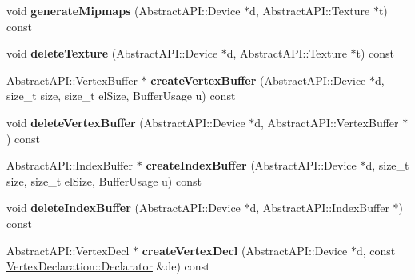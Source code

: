 \begin{DoxyCompactItemize}
\item 
\hypertarget{class_tempest_1_1_direct_x9_aa71036e276637c1db1acb5f01595300e}{void {\bfseries generate\+Mipmaps} (Abstract\+A\+P\+I\+::\+Device $\ast$d, Abstract\+A\+P\+I\+::\+Texture $\ast$t) const }\label{class_tempest_1_1_direct_x9_aa71036e276637c1db1acb5f01595300e}

\item 
\hypertarget{class_tempest_1_1_direct_x9_a702be05b45834a30d673f88cded2da1f}{void {\bfseries delete\+Texture} (Abstract\+A\+P\+I\+::\+Device $\ast$d, Abstract\+A\+P\+I\+::\+Texture $\ast$t) const }\label{class_tempest_1_1_direct_x9_a702be05b45834a30d673f88cded2da1f}

\item 
\hypertarget{class_tempest_1_1_direct_x9_af8da297fcff932c9ecaa7a0163abc74d}{Abstract\+A\+P\+I\+::\+Vertex\+Buffer $\ast$ {\bfseries create\+Vertex\+Buffer} (Abstract\+A\+P\+I\+::\+Device $\ast$d, size\+\_\+t size, size\+\_\+t el\+Size, Buffer\+Usage u) const }\label{class_tempest_1_1_direct_x9_af8da297fcff932c9ecaa7a0163abc74d}

\item 
\hypertarget{class_tempest_1_1_direct_x9_a13ea63b17205313562967bea5c41c41b}{void {\bfseries delete\+Vertex\+Buffer} (Abstract\+A\+P\+I\+::\+Device $\ast$d, Abstract\+A\+P\+I\+::\+Vertex\+Buffer $\ast$) const }\label{class_tempest_1_1_direct_x9_a13ea63b17205313562967bea5c41c41b}

\item 
\hypertarget{class_tempest_1_1_direct_x9_a948f7173213bfa00ee8f535d9902bac6}{Abstract\+A\+P\+I\+::\+Index\+Buffer $\ast$ {\bfseries create\+Index\+Buffer} (Abstract\+A\+P\+I\+::\+Device $\ast$d, size\+\_\+t size, size\+\_\+t el\+Size, Buffer\+Usage u) const }\label{class_tempest_1_1_direct_x9_a948f7173213bfa00ee8f535d9902bac6}

\item 
\hypertarget{class_tempest_1_1_direct_x9_a64a062ad8b6cf9683302ff1671144ca1}{void {\bfseries delete\+Index\+Buffer} (Abstract\+A\+P\+I\+::\+Device $\ast$d, Abstract\+A\+P\+I\+::\+Index\+Buffer $\ast$) const }\label{class_tempest_1_1_direct_x9_a64a062ad8b6cf9683302ff1671144ca1}

\item 
\hypertarget{class_tempest_1_1_direct_x9_a8165b60f240a29a6638c847b58840526}{Abstract\+A\+P\+I\+::\+Vertex\+Decl $\ast$ {\bfseries create\+Vertex\+Decl} (Abstract\+A\+P\+I\+::\+Device $\ast$d, const \hyperlink{class_tempest_1_1_vertex_declaration_1_1_declarator}{Vertex\+Declaration\+::\+Declarator} \&de) const }\label{class_tempest_1_1_direct_x9_a8165b60f240a29a6638c847b58840526}


\end{DoxyCompactItemize}
